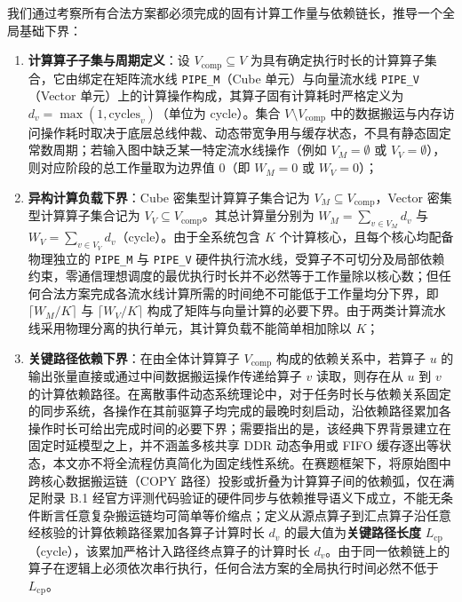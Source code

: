 \documentclass[anonymous,withtoc]{gmcm2026}
\providecommand{\tightlist}{\setlength{\itemsep}{0pt}\setlength{\parskip}{0pt}}
\begin{document}
我们通过考察所有合法方案都必须完成的固有计算工作量与依赖链长，推导一个全局基础下界：

\begin{enumerate}
\def\labelenumi{\arabic{enumi}.}
\tightlist
\item
  \textbf{计算算子子集与周期定义}：设 \(V_{\mathrm{comp}} \subseteq V\) 为具有确定执行时长的计算算子集合，它由绑定在矩阵流水线 \texttt{PIPE\_M}（Cube 单元）与向量流水线 \texttt{PIPE\_V}（Vector 单元）上的计算操作构成，其算子固有计算耗时严格定义为 \(d_v = \max(1, \text{cycles}_v)\)（单位为 cycle）。集合 \(V \setminus V_{\mathrm{comp}}\) 中的数据搬运与内存访问操作耗时取决于底层总线仲裁、动态带宽争用与缓存状态，不具有静态固定常数周期；若输入图中缺乏某一特定流水线操作（例如 \(V_M = \emptyset\) 或 \(V_V = \emptyset\)），则对应阶段的总工作量取为边界值 0（即 \(W_M = 0\) 或 \(W_V = 0\)）；
\item
  \textbf{异构计算负载下界}：Cube 密集型计算算子集合记为 \(V_M \subseteq V_{\mathrm{comp}}\)，Vector 密集型计算算子集合记为 \(V_V \subseteq V_{\mathrm{comp}}\)。其总计算量分别为 \(W_M = \sum_{v \in V_M} d_v\) 与 \(W_V = \sum_{v \in V_V} d_v\)（cycle）。由于全系统包含 \(K\) 个计算核心，且每个核心均配备物理独立的 \texttt{PIPE\_M} 与 \texttt{PIPE\_V} 硬件执行流水线，受算子不可切分及局部依赖约束，零通信理想调度的最优执行时长并不必然等于工作量除以核心数；但任何合法方案完成各流水线计算所需的时间绝不可能低于工作量均分下界，即 \(\lceil W_M / K \rceil\) 与 \(\lceil W_V / K \rceil\) 构成了矩阵与向量计算的必要下界。由于两类计算流水线采用物理分离的执行单元，其计算负载不能简单相加除以 \(K\)；
\item
  \textbf{关键路径依赖下界}：在由全体计算算子 \(V_{\mathrm{comp}}\) 构成的依赖关系中，若算子 \(u\) 的输出张量直接或通过中间数据搬运操作传递给算子 \(v\) 读取，则存在从 \(u\) 到 \(v\) 的计算依赖路径。在离散事件动态系统理论中，对于任务时长与依赖关系固定的同步系统，各操作在其前驱算子均完成的最晚时刻启动，沿依赖路径累加各操作时长可给出完成时间的必要下界\cite{ref20}；需要指出的是，该经典下界背景建立在固定时延模型之上，并不涵盖多核共享 DDR 动态争用或 FIFO 缓存逐出等状态，本文亦不将全流程仿真简化为固定线性系统。在赛题框架下，将原始图中跨核心数据搬运链（COPY 路径）投影或折叠为计算算子间的依赖弧，仅在满足附录 B.1 经官方评测代码验证的硬件同步与依赖推导语义下成立，不能无条件断言任意复杂搬运链均可简单等价缩点；定义从源点算子到汇点算子沿任意经核验的计算依赖路径累加各算子计算时长 \(d_v\) 的最大值为\textbf{关键路径长度} \(L_{\mathrm{cp}}\)（cycle），该累加严格计入路径终点算子的计算时长 \(d_v\)。由于同一依赖链上的算子在逻辑上必须依次串行执行，任何合法方案的全局执行时间必然不低于 \(L_{\mathrm{cp}}\)。
\end{enumerate}
\end{document}
